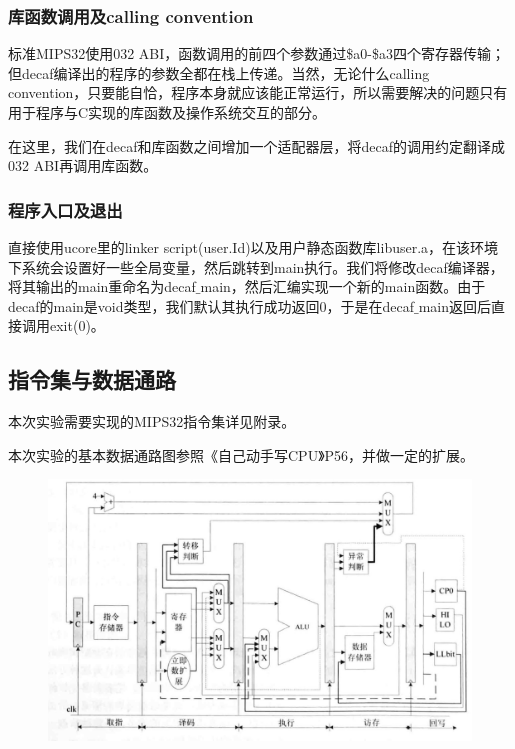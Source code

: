 \subsubsection{库函数调用及calling convention}
标准MIPS32使用032 ABI，函数调用的前四个参数通过\$a0-\$a3四个寄存器传输；但decaf编译出的程序的参数全都在栈上传递。当然，无论什么calling convention，只要能自恰，程序本身就应该能正常运行，所以需要解决的问题只有用于程序与C实现的库函数及操作系统交互的部分。

在这里，我们在decaf和库函数之间增加一个适配器层，将decaf的调用约定翻译成032 ABI再调用库函数。
\subsubsection{程序入口及退出}
直接使用ucore里的linker script(user.Id)以及用户静态函数库libuser.a，在该环境下系统会设置好一些全局变量，然后跳转到main执行。我们将修改decaf编译器，将其输出的main重命名为decaf$\_$main，然后汇编实现一个新的main函数。由于decaf的main是void类型，我们默认其执行成功返回0，于是在decaf$\_$main返回后直接调用exit(0)。
\subsection{指令集与数据通路}
本次实验需要实现的MIPS32指令集详见附录。

本次实验的基本数据通路图参照《自己动手写CPU》P56，并做一定的扩展。

\begin{figure}[h]
\centering
\includegraphics[scale=0.2]{datapath.eps}
\end{figure}
